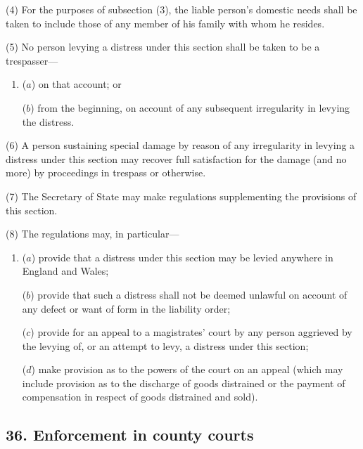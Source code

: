 \documentclass[12pt,a4paper]{article}
\begin{document}
(4) For the purposes of subsection (3), the liable person’s domestic needs shall be taken to include those of any member of his family with whom he resides.

(5) No person levying a distress under this section shall be taken to be a trespasser—
\begin{enumerate}\item[]
($a$) on that account; or

($b$) from the beginning, on account of any subsequent irregularity in levying the distress.
\end{enumerate}

(6) A person sustaining special damage by reason of any irregularity in levying a distress under this section may recover full satisfaction for the damage (and no more) by proceedings in trespass or otherwise.

(7) The Secretary of State may make regulations supplementing the provisions of this section.

(8) The regulations may, in particular—
\begin{enumerate}\item[]
($a$) provide that a distress under this section may be levied anywhere in England and Wales;

($b$) provide that such a distress shall not be deemed unlawful on account of any defect or want of form in the liability order;

($c$) provide for an appeal to a magistrates' court by any person aggrieved by the levying of, or an attempt to levy, a distress under this section;

($d$) make provision as to the powers of the court on an appeal (which may include provision as to the discharge of goods distrained or the payment of compensation in respect of goods distrained and sold).
\end{enumerate}


\subsection{36. Enforcement in county courts}
\end{document}
